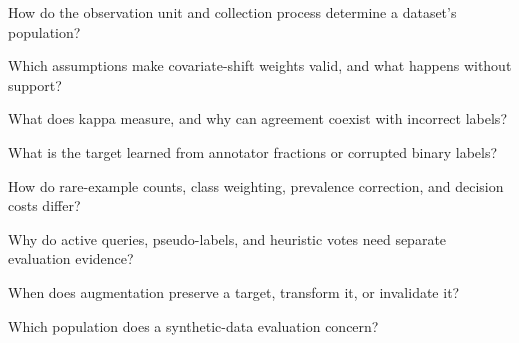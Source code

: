 \begin{studyquestions}
\item How do the observation unit and collection process determine a dataset's population?
\item Which assumptions make covariate-shift weights valid, and what happens without support?
\item What does kappa measure, and why can agreement coexist with incorrect labels?
\item What is the target learned from annotator fractions or corrupted binary labels?
\item How do rare-example counts, class weighting, prevalence correction, and decision costs differ?
\item Why do active queries, pseudo-labels, and heuristic votes need separate evaluation evidence?
\item When does augmentation preserve a target, transform it, or invalidate it?
\item Which population does a synthetic-data evaluation concern?
\end{studyquestions}


